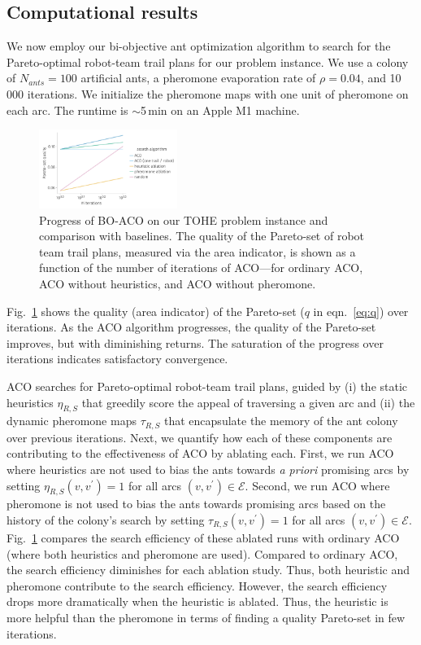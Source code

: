 \documentclass[fleqn,10pt,lineno]{wlpeerj}
\begin{document}
\subsection{Computational results}
We now employ our bi-objective ant optimization algorithm to search for the Pareto-optimal robot-team trail plans for our problem instance.
We use a colony of $N_{ants}=100$ artificial ants, a pheromone evaporation rate of $\rho=0.04$, and 10\,000 iterations. We initialize the pheromone maps with one unit of pheromone on each arc.
The runtime is $\sim$5\,min on an Apple M1 machine.

\begin{figure}[h!]
    \centering
    \includegraphics[width=0.4\textwidth]{ACO_comparison.pdf}
    \caption{Progress of BO-ACO on our TOHE problem instance and comparison with baselines. 
    The quality of the Pareto-set of robot team trail plans, measured via the area indicator, is shown as a function of the number of iterations of ACO---for ordinary ACO, ACO without heuristics, and ACO without pheromone.
    } \label{fig:aco_progress}
\end{figure}

Fig.~\ref{fig:aco_progress} shows the quality (area indicator) of the Pareto-set ($q$ in eqn.~\ref{eq:q}) over iterations. As the ACO algorithm progresses, the quality of the Pareto-set improves, but with diminishing returns. The saturation of the progress over iterations indicates satisfactory convergence.

ACO searches for Pareto-optimal robot-team trail plans,
guided by (i) the static heuristics $\eta_{R,S}$ that greedily score the appeal of traversing a given arc and (ii) the dynamic pheromone maps $\tau_{R,S}$ that encapsulate the memory of the ant colony over previous iterations. 
Next, we quantify how each of these components are contributing to the effectiveness of ACO by ablating each. 
First, we run ACO where heuristics are not used to bias the ants towards \emph{a priori} promising arcs by setting $\eta_{R,S}(v, v^\prime)=1$ for all arcs $(v, v^\prime)\in \mathcal{E}$. Second, we run ACO where pheromone is not used to bias the ants towards promising arcs based on the history of the colony's search by setting $\tau_{R,S}(v, v^\prime)=1$ for all arcs $(v, v^\prime)\in \mathcal{E}$.
Fig.~\ref{fig:aco_progress} compares the search efficiency of these ablated runs with ordinary ACO (where both heuristics and pheromone are used).
Compared to ordinary ACO, the search efficiency diminishes for each ablation study. 
Thus, both heuristic and pheromone contribute to the search efficiency.
However, the search efficiency drops more dramatically when the heuristic is ablated. 
Thus, the heuristic is more helpful than the pheromone in terms of finding a quality Pareto-set in few iterations. 
\end{document}
